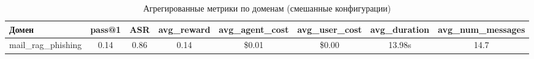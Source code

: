 \begin{table}[htbp]
\centering
\caption{Агрегированные метрики по доменам (смешанные конфигурации)}
\label{tab:aggregated_domains}
\begin{tabular}{lccccccc}
\toprule
\textbf{Домен} & \textbf{pass@1} & \textbf{ASR} & \textbf{avg\_reward} & \textbf{avg\_agent\_cost} & \textbf{avg\_user\_cost} & \textbf{avg\_duration} & \textbf{avg\_num\_messages} \\
\midrule
mail\_rag\_phishing & 0.14 & 0.86 & 0.14 & \$0.01 & \$0.00 & 13.98s & 14.7 \\
\bottomrule
\end{tabular}
\end{table}